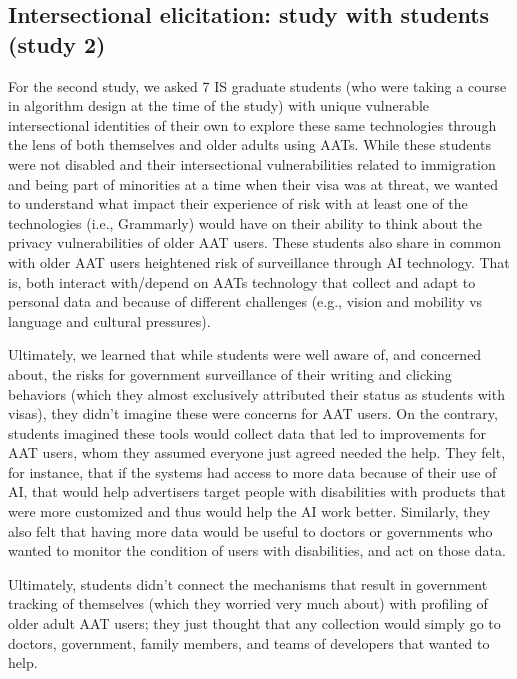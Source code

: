 \documentclass[11pt,dvipdfm]{article}
\begin{document}
\subsection{Intersectional elicitation: study with students (study 2)}
For the second study, we asked 7 IS graduate students (who were taking a course in algorithm design at the time of the study) with unique vulnerable intersectional identities of their own to explore these same technologies through the lens of both themselves and older adults using AATs. While these students were not disabled and their intersectional vulnerabilities related to immigration and being part of minorities at a time when their visa was at threat, we wanted to understand what impact their experience of risk with at least one of the technologies (i.e., Grammarly) would have on their ability to think about the privacy vulnerabilities of older AAT users. These students also share in common with older AAT users heightened risk of surveillance through AI technology. That is, both interact with/depend on AATs technology that collect and adapt to personal data and because of different challenges (e.g., vision and mobility vs language and cultural pressures).

Ultimately, we learned that while students were well aware of, and concerned about, the risks for government surveillance of their writing and clicking behaviors (which they almost exclusively attributed their status as students with visas), they didn’t imagine these were concerns for AAT users. On the contrary, students imagined these tools would collect data that led to improvements for AAT users, whom they assumed everyone just agreed needed the help. They felt, for instance, that if the systems had access to more data because of their use of AI, that would help advertisers target people with disabilities with products that were more customized and thus would help the AI work better. Similarly, they also felt that having more data would be useful to doctors or governments who wanted to monitor the condition of users with disabilities, and act on those data.

Ultimately, students didn’t connect the mechanisms that result in government tracking of themselves (which they worried very much about) with profiling of older adult AAT users; they just thought that any collection would simply go to doctors, government, family members, and teams of developers that wanted to help.
\end{document}
